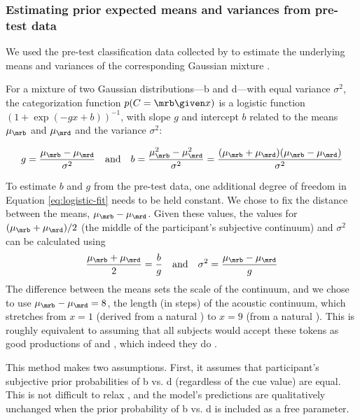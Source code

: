 \subsubsection{Estimating prior expected means and variances from pre-test data}
\label{sec:prior-expected-means}

We used the pre-test classification data collected by \textcite{Vroomen2007} to estimate the underlying means and variances of the corresponding Gaussian mixture \autocite{Feldman2009a}.

For a mixture of two Gaussian distributions---\ph b and \ph d---with equal variance $\sigma^2$, the categorization function $p(C=\mrb \given x)$ is a logistic function $(1+\exp(-gx + b))^{-1}$, with slope $g$ and intercept $b$ related to the means $\mu_\mrb$ and $\mu_\mrd$ and the variance $\sigma^2$:

\begin{equation}
\label{eq:logistic-fit}
g = \frac{\mu_\mrb-\mu_\mrd}{\sigma^2} \quad \mathrm{and} \quad b= \frac{\mu_\mrb^2 - \mu_\mrd^2}{\sigma^2} = \frac{(\mu_\mrb + \mu_\mrd)(\mu_\mrb - \mu_\mrd)}{\sigma^2}
\end{equation}

To estimate $b$ and $g$ from the pre-test data, one additional degree of freedom in Equation \ref{eq:logistic-fit} needs to be held constant. We chose to fix the distance between the means, $\mu_\mrb-\mu_\mrd$.  Given these values, the values for $(\mu_\mrb+\mu_\mrd)/2$ (the middle of the participant's subjective continuum) and $\sigma^2$ can be calculated using
\begin{equation}
\label{eq:prior-vals}
\frac{\mu_\mrb+\mu_\mrd}{2} = \frac{b}{g} \quad\mathrm{and}\quad \sigma^2 = \frac {\mu_\mrb-\mu_\mrd}{g}
\end{equation}
The difference between the means sets the scale of the continuum, and we chose to use $\mu_\mrb-\mu_\mrd=8$, the length (in steps) of the acoustic continuum, which stretches from $x=1$ (derived from a natural ) to $x=9$ (from a natural ).  This is roughly equivalent to assuming that all subjects would accept these tokens as good productions of  and , which indeed they do \autocite{Vroomen2004}.

This method makes two assumptions.  First, it assumes that participant's subjective prior probabilities of \ph b vs. \ph d (regardless of the cue value) are equal.  This is not difficult to relax \autocite[it only shifts the boundary of the classification function by the log ratio of the prior probabilities;][]{Feldman2009a}, and the model's predictions are qualitatively unchanged when the prior probability of \ph b vs. \ph d is included as a free parameter.

